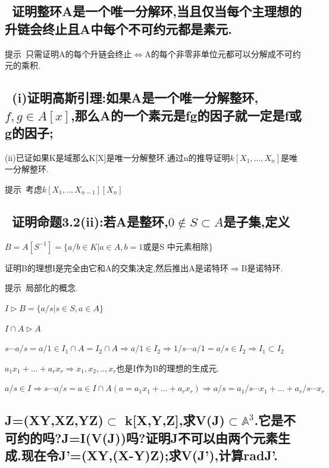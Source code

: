 \documentclass[UTF8]{book}
\begin{document}
	
	\subsection{\ 证明整环A是一个唯一分解环,当且仅当每个主理想的升链会终止且A中每个不可约元都是素元.}
	
	
	$\textbf{提示}$\ 只需证明A的每个升链会终止$\Leftrightarrow$A的每个非零非单位元都可以分解成不可约元的乘积.
	
	
	\subsection{\ (i)证明高斯引理:如果A是一个唯一分解整环,$f,g\in A[x]$,那么A的一个素元是fg的因子就一定是f或g的因子;}
	
	
	(ii)已证如果K是域那么K[X]是唯一分解整环.通过n的推导证明$k[X_{1},...,X_{n}]$是唯一分解整环.
	
	
	$\textbf{提示}$\ 考虑$k[X_{1},..,X_{n-1}][X_{n}]$
	
	
	\subsection{\ 证明命题3.2(ii):若A是整环,$0\notin S\subset A$是子集,定义}
	
	
	\begin{center}
		$B=A[S^{-1}]=\{a/b\in K| a\in A,b=1$或是S 中元素相除\}
	\end{center}
	
	
	证明B的理想I是完全由它和A的交集决定,然后推出A是诺特环$\Rightarrow$B是诺特环.
	
	
	$\textbf{提示}$\ 局部化的概念.
	
	
	$I\rhd B=\{a/s|s\in S,a\in A\}$
	
	
	$I\cap A\rhd A$
	
	
	$s\cdots a/s=a/1\in I_{1}\cap A=I_{2}\cap A \Rightarrow a/1\in I_{2} \Rightarrow 1/s\cdots a/1=a/s\in I_{2} \Rightarrow I_{1}\subset I_{2}$
	
	
	$a_{1}x_{1}+...+a_{r}x_{r}\Rightarrow x_{1},x_{2},..,x_{r}$也是I作为B的理想的生成元.
	
	
	$a/s\in I\Rightarrow s\cdots a/s=a\in I\cap A(a=a_{1}x_{1}+...+a_{r}x_{r})\Rightarrow a/s=a_{1}/s\cdots x_{1}+...+a_{r}/s\cdots x_{r}$
	
	
	\subsection{ J=(XY,XZ,YZ)$\subset$ k[X,Y,Z],求V(J)$\subset \mathbb{A}^{3}$.它是不可约的吗?J=I(V(J))吗?证明J不可以由两个元素生成.现在令J'=(XY,(X-Y)Z);求V(J'),计算radJ'.}
	
\end{document}
